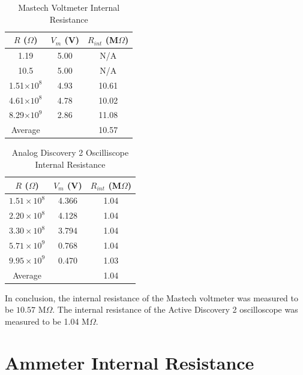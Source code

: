 \documentclass{article}
\renewcommand{\O}{\(\Omega\)}
\begin{document}
    \begin{table}[H]
        \centering
        \begin{tabular}{c|c|c}
            \(R\) (\O)& \(V_m\) (V) & \(R_{int}\) (M\O)\\
            \hline
            1.19 & 5.00 & N/A\\
            10.5 & 5.00 & N/A\\
            1.51\(\times 10^8\) & 4.93  & 10.61 \\
            4.61\(\times 10^8\) & 4.78 & 10.02 \\
            8.29\(\times 10^{9}\) & 2.86 & 11.08 \\
            \hline
            Average & & 10.57 
        \end{tabular}
        \caption{Mastech Voltmeter Internal Resistance}
    \end{table}

    \begin{table}[H]
        \centering
        \begin{tabular}{c|c|c}
            \(R\) (\O) & \(V_m\) (V) & \(R_{int}\) (M\O)\\
            \hline
            \(1.51\times 10^{8}\) & 4.366 & 1.04\\
            \(2.20\times 10^{8}\) & 4.128 & 1.04\\
            \(3.30\times 10^{8}\) & 3.794 & 1.04\\
            \(5.71\times 10^{9}\) & 0.768 & 1.04\\
            \(9.95\times 10^{9}\) & 0.470 & 1.03\\
            \hline
            Average & & 1.04
        \end{tabular}
        \caption{Analog Discovery 2 Oscilliscope Internal Resistance}
    \end{table}

    In conclusion, the internal resistance of the Mastech voltmeter was measured to be \(10.57\) M\O. The internal resistance of the Active Discovery 2 oscilloscope was measured to be 1.04 M\O.

    \section{Ammeter Internal Resistance}
\end{document}
